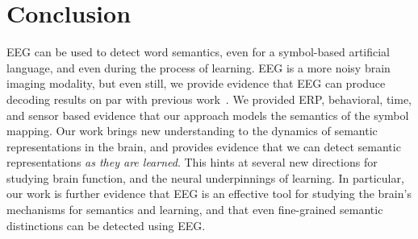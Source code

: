 \section{Conclusion}
EEG can be used to detect word semantics, even for a symbol-based artificial 
language, and even during the process of learning.  EEG is a more noisy brain 
imaging modality, but even still, we provide evidence that EEG can produce 
decoding results on par with previous work~\cite{Mitchell2008}. We provided 
ERP, behavioral, time, and sensor based evidence that our approach models the 
semantics of the symbol mapping. Our work brings new understanding to the 
dynamics of semantic representations in the brain, and provides evidence that 
we can detect semantic representations \emph{as they are learned}.  This hints 
at several new directions for studying brain function, and the neural 
underpinnings of learning.  In particular, our work is further evidence that 
EEG is an effective tool for studying the brain's mechanisms for semantics and 
learning, and that even fine-grained semantic distinctions can be detected 
using EEG.
